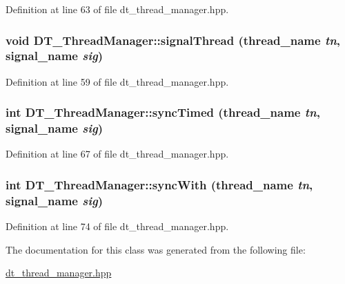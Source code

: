 Definition at line 63 of file dt\_\-thread\_\-manager.hpp.\hypertarget{class_d_t___thread_manager_a47ec8fd514dd8abcc48765207b448b73}{
\subsubsection[{signalThread}]{\setlength{\rightskip}{0pt plus 5cm}void DT\_\-ThreadManager::signalThread ({\bf thread\_\-name} {\em tn}, \/  {\bf signal\_\-name} {\em sig})}}
\label{class_d_t___thread_manager_a47ec8fd514dd8abcc48765207b448b73}


Definition at line 59 of file dt\_\-thread\_\-manager.hpp.\hypertarget{class_d_t___thread_manager_aa8d8e388e11f0c3ecc8f7491dc53ca08}{
\subsubsection[{syncTimed}]{\setlength{\rightskip}{0pt plus 5cm}int DT\_\-ThreadManager::syncTimed ({\bf thread\_\-name} {\em tn}, \/  {\bf signal\_\-name} {\em sig})}}
\label{class_d_t___thread_manager_aa8d8e388e11f0c3ecc8f7491dc53ca08}


Definition at line 67 of file dt\_\-thread\_\-manager.hpp.\hypertarget{class_d_t___thread_manager_adbab3141f1f3d1361673561aef9bfa79}{
\subsubsection[{syncWith}]{\setlength{\rightskip}{0pt plus 5cm}int DT\_\-ThreadManager::syncWith ({\bf thread\_\-name} {\em tn}, \/  {\bf signal\_\-name} {\em sig})}}
\label{class_d_t___thread_manager_adbab3141f1f3d1361673561aef9bfa79}


Definition at line 74 of file dt\_\-thread\_\-manager.hpp.

The documentation for this class was generated from the following file:\begin{DoxyCompactItemize}
\item 
\hyperlink{dt__thread__manager_8hpp}{dt\_\-thread\_\-manager.hpp}\end{DoxyCompactItemize}
